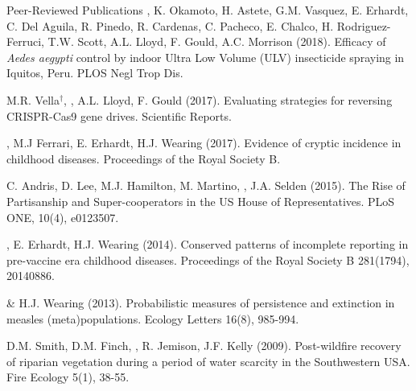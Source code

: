 \documentclass{resume} %
\begin{document}
\begin{rSection}{Peer-Reviewed Publications}
\authSelf, K. Okamoto, H. Astete, G.M. Vasquez, E. Erhardt, 
C. Del Aguila, R. Pinedo, R. Cardenas, C. Pacheco, E. Chalco, 
H. Rodriguez-Ferruci, T.W. Scott, A.L. Lloyd, F. Gould, A.C. Morrison (2018).
Efficacy of {\em Aedes aegypti} control by indoor Ultra Low Volume (ULV)
insecticide spraying in Iquitos, Peru. PLOS Negl Trop Dis.

M.R. Vella$^\dagger$, \authSelf, A.L. Lloyd, F. Gould (2017).
Evaluating strategies for reversing CRISPR-Cas9 gene drives.
Scientific Reports.

\authSelf, M.J Ferrari, E. Erhardt, H.J. Wearing (2017).
Evidence of cryptic incidence in childhood diseases. 
Proceedings of the Royal Society B.

C. Andris, D. Lee, M.J.  Hamilton, M. Martino, \authSelf,  J.A. Selden (2015).
The Rise of Partisanship and Super-cooperators in the US House of Representatives.
PLoS ONE, 10(4), e0123507.

\authSelf, E. Erhardt, H.J. Wearing (2014). 
Conserved patterns of incomplete reporting in pre-vaccine era childhood diseases.
Proceedings of the Royal Society B 281(1794), 20140886. 

\authSelf \& H.J. Wearing (2013). Probabilistic measures of persistence
and extinction in measles (meta)populations. Ecology Letters 16(8), 985-994.

D.M. Smith, D.M. Finch, \authSelf, R. Jemison, J.F. Kelly (2009). Post-wildfire recovery of riparian vegetation during a period of water scarcity in the Southwestern USA. Fire Ecology 5(1), 38-55.
\end{rSection}
\end{document}
